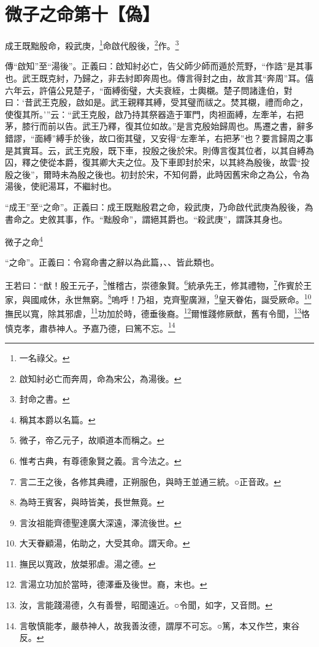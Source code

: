 \section{微子之命第十【偽】}


成王既黜殷命，殺武庚，\footnote{一名祿父。}命啟代殷後，\footnote{啟知紂必亡而奔周，命為宋公，為湯後。}作。\footnote{封命之書。}


{\noindent\zhuan{}\fzbyks 傳“啟知”至“湯後”。正義曰：啟知紂必亡，告父師少師而遁於荒野，“作誥”是其事也。武王既克紂，乃歸之，非去紂即奔周也。傳言得封之由，故言其“奔周”耳。僖六年云，許僖公見楚子，“面縛銜璧，大夫衰絰，士輿櫬。楚子問諸逢伯，對曰：‘昔武王克殷，啟如是。武王親釋其縛，受其璧而祓之。焚其櫬，禮而命之，使復其所。’”云：“武王克殷，啟乃持其祭器造于軍門，肉袒面縛，左牽羊，右把茅，膝行而前以告。武王乃釋，復其位如故。”是言克殷始歸周也。馬遷之書，辭多錯謬，“面縛”縛手於後，故口銜其璧，又安得“左牽羊，右把茅”也？要言歸周之事是其實耳。云，武王克殷，既下車，投殷之後於宋。則傳言復其位者，以其自縛為囚，釋之使從本爵，復其卿大夫之位。及下車即封於宋，以其終為殷後，故雲“投殷之後”，爾時未為殷之後也。初封於宋，不知何爵，此時因舊宋命之為公，令為湯後，使祀湯耳，不繼紂也。 \par}

{\noindent\shu{}\fzkt “成王”至“之命”。正義曰：成王既黜殷君之命，殺武庚，乃命啟代武庚為殷後，為書命之。史敘其事，作。“黜殷命”，謂絕其爵也。“殺武庚”，謂誅其身也。 \par}

微子之命\footnote{稱其本爵以名篇。}

{\noindent\shu{}\fzkt “之命”。正義曰：令寫命書之辭以為此篇，、、皆此類也。 \par}

王若曰：“猷！殷王元子，\footnote{微子，帝乙元子，故順道本而稱之。}惟稽古，崇德象賢。\footnote{惟考古典，有尊德象賢之義。言今法之。}統承先王，修其禮物，\footnote{言二王之後，各修其典禮，正朔服色，與時王並通三統。○正音政。}作賓於王家，與國咸休，永世無窮。\footnote{為時王賓客，與時皆美，長世無竟。}嗚呼！乃祖，克齊聖廣淵，\footnote{言汝祖能齊德聖達廣大深遠，澤流後世。}皇天眷佑，誕受厥命。\footnote{大天眷顧湯，佑助之，大受其命。謂天命。}撫民以寬，除其邪虐，\footnote{撫民以寬政，放桀邪虐。湯之德。}功加於時，德垂後裔。\footnote{言湯立功加於當時，德澤垂及後世。裔，末也。}爾惟踐修厥猷，舊有令聞，\footnote{汝，言能踐湯德，久有善譽，昭聞遠近。○令聞，如字，又音問。}恪慎克孝，肅恭神人。予嘉乃德，曰篤不忘。\footnote{言敬慎能孝，嚴恭神人，故我善汝德，謂厚不可忘。○篤，本又作竺，東谷反。}



